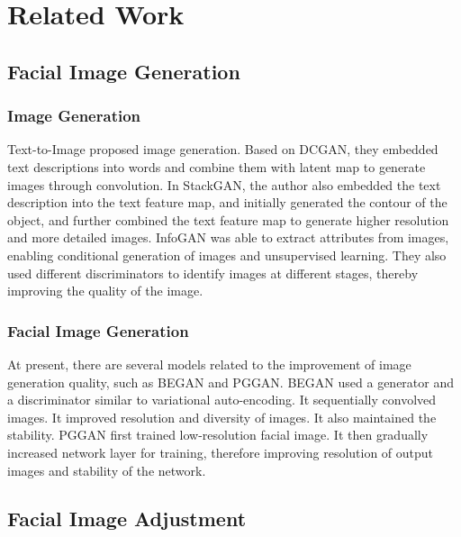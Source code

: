 \section{Related Work}

\subsection{Facial Image Generation}

\subsubsection*{Image Generation}

Text-to-Image proposed image generation.
Based on DCGAN, they embedded text descriptions into words and combine them with latent map to generate images through convolution.
In StackGAN, the author also embedded the text description into the text feature map,
    and initially generated the contour of the object,
    and further combined the text feature map to generate higher resolution and more detailed images.
    InfoGAN was able to extract attributes from images, enabling conditional generation of images and unsupervised learning.
They also used different discriminators to identify images at different stages, thereby improving the quality of the image.


\subsubsection*{Facial Image Generation}

At present, there are several models related to the improvement of image generation quality,
    such as BEGAN and PGGAN.
BEGAN used a generator and a discriminator similar to variational auto-encoding.
It sequentially convolved images. It improved resolution and diversity of images. It also maintained the stability.
PGGAN first trained low-resolution facial image. It then gradually increased network layer for training, 
therefore improving resolution of output images and stability of the network.



\subsection{Facial Image Adjustment}

